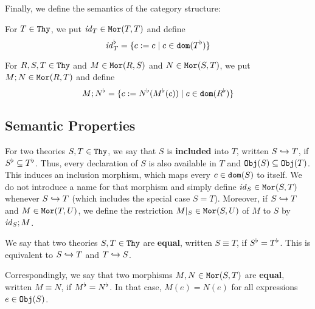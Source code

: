 Finally, we define the semantics of the category structure:
\begin{example}\label{sem:cat}
For $T\in\mathtt{Thy}$, we put $\mathit{id}_{T}\in\mathtt{Mor}(T,T)$ and define
\[\mathit{id}_{T}^\flat=\{c:=c \;|\; c\in\mathtt{dom}(T^\flat)\}\]

For $R,S,T\in\mathtt{Thy}$ and $M\in\mathtt{Mor}(R,S)$ and $N\in\mathtt{Mor}(S,T)$, we put $M;N\in\mathtt{Mor}(R,T)$ and define
\[M;N^\flat=\{c:=N^\flat(M^\flat(c)) \;|\; c\in\mathtt{dom}(R^\flat)\}\]
\end{example}


\subsection{Semantic Properties}

For two theories $S,T\in\mathtt{Thy}$, we say that $S$ is \textbf{included} into $T$, written $S\hookrightarrow T$, if $S^\flat\subseteq T^\flat$.
Thus, every declaration of $S$ is also available in $T$ and $\mathtt{Obj}(S)\subseteq\mathtt{Obj}(T)$.
This induces an inclusion morphism, which maps every $c\in\mathtt{dom}(S)$ to itself.
We do not introduce a name for that morphism and simply define $\mathit{id}_{S}\in\mathtt{Mor}(S,T)$ whenever $S\hookrightarrow T$ (which includes the special case $S=T$).
Moreover, if $S\hookrightarrow T$ and $M\in\mathtt{Mor}(T,U)$, we define the restriction $M|_S\in\mathtt{Mor}(S,U)$ of $M$ to $S$ by $\mathit{id}_{S};M$.

We say that two theories $S,T\in\mathtt{Thy}$ are \textbf{equal}, written $S\equiv T$, if $S^\flat=T^\flat$.
This is equivalent to $S\hookrightarrow T$ and $T\hookrightarrow S$.

Correspondingly, we say that two morphisms $M,N\in\mathtt{Mor}(S,T)$ are \textbf{equal}, written $M\equiv N$, if $M^\flat=N^\flat$.
In that case, $M(e)=N(e)$ for all expressions $e\in\mathtt{Obj}(S)$.

